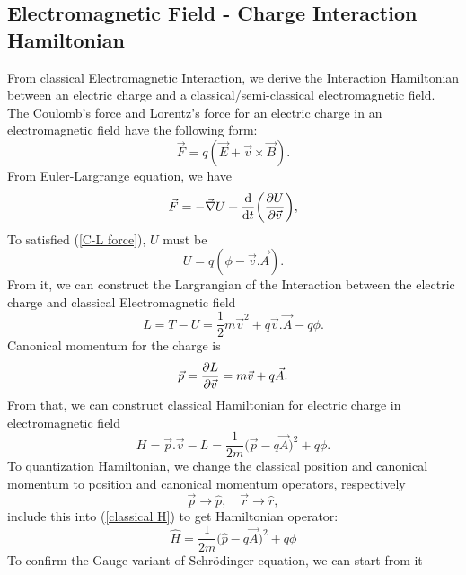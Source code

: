 \documentclass[12pt,english,a4paper]{article}
\begin{document}
\begin{appendices}
\section{Electromagnetic Field - Charge Interaction Hamiltonian}
\quad From classical Electromagnetic Interaction, we derive the Interaction Hamiltonian between an electric charge and a classical/semi-classical electromagnetic field. The Coulomb's force and Lorentz's force for an electric charge in an electromagnetic field have the following form:
\begin{equation}
	\vec{F} = q (\vec{E} + \vec{v} \times \vec{B}).
\end{equation}
\quad From Euler-Largrange equation, we have
\begin{equation}
	\label{C-L force}
	\vec{F} = - \vec{\nabla} U + \dv{ }{t} \bigg(\pdv{U}{\vec{v}}\bigg) ,
\end{equation}
\quad To satisfied (\ref{C-L force}), $U$ must be
\begin{equation}
	U = q(\phi- \vec{v}.\vec{A}).
\end{equation}
\quad From it, we can construct the Largrangian of the Interaction between the electric charge and classical Electromagnetic field
\begin{equation}
	L = T - U = \frac{1}{2}m \vec{v}^2 + q\vec{v}.\vec{A} -q\phi.
\end{equation}
\quad Canonical momentum for the charge is
\begin{equation}
	\label{cannonical momentum}
	\vec{p} = \pdv{L}{\vec{v}} = m\vec{v} + q\vec{A}.
\end{equation}
\quad From that, we can construct classical Hamiltonian for electric charge in electromagnetic field
\begin{equation}
	\label{classical H}
	H = \vec{p}.\vec{v} - L = \frac{1}{2m}\big(\vec{p} - q \vec{A}\big)^2 + q\phi.
\end{equation}
\quad To quantization Hamiltonian, we change the classical position and canonical momentum to position and canonical momentum operators, respectively
$$\vec{p}\longrightarrow \hat{p}, \quad \vec{r}\longrightarrow \hat{r},$$ \null
\quad include this into (\ref{classical H}) to get Hamiltonian operator:
\begin{equation}
	\label{H operator}
	\hat{H} = \frac{1}{2m}\big(\hat{p} - q \vec{A}\big)^2 + q\phi
\end{equation}
\quad To confirm the Gauge variant of Schrödinger equation, we can start from it

\end{appendices}
\end{document}
